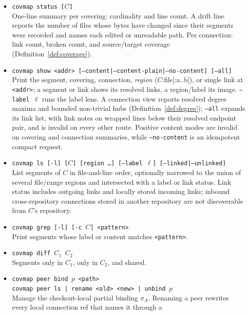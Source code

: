 \documentclass[11pt,a4paper]{article}
\begin{document}
\begin{itemize}[leftmargin=2em,itemsep=2pt]
\item \texttt{covmap status [$C$]}\\
      One-line summary per covering: cardinality and line count. A drift
      line reports the number of files whose bytes have changed since
      their segments were recorded and names each edited or unreadable
      path. Per connection: link count, broken count, and source/target
      coverage (Definition~\ref{def:coverage}).
\item \texttt{covmap show <addr>
      [--content|--content-plain|--no-content] [--all]}\\
      Print the segment, covering, connection, \emph{region}
      ($C$:file[:a..b]), or single link at \texttt{<addr>}; a segment or
      link shows its resolved links, a region/label its image. \texttt{--label
      $\ell$} runs the label lens. A connection view reports resolved degree
      maxima and bounded non-trivial hubs (Definition~\ref{def:degree});
      \texttt{--all} expands its link list, with link notes on wrapped lines
      below their resolved endpoint pair, and is invalid on every other
      route. Positive content modes are invalid on covering and connection
      summaries, while \texttt{--no-content} is an idempotent compact request.
\item \texttt{covmap ls [-l] [$C$] [region \ldots] [--label $\ell$] [--linked|--unlinked]}\\
      List segments of $C$ in file-and-line order, optionally narrowed to the
      union of several file/range regions and intersected with a label or link
      status. Link status includes outgoing links and locally stored incoming
      links; inbound cross-repository connections stored in another repository
      are not discoverable from $C$'s repository.
\item \texttt{covmap grep [-l] [-c $C$] <pattern>}\\
      Print segments whose label or content matches \texttt{<pattern>}.
\item \texttt{covmap diff $C_1$ $C_2$}\\
      Segments only in $C_1$, only in $C_2$, and shared.
\item \texttt{covmap peer bind $p$ <path>}\\
      \texttt{covmap peer ls | rename <old> <new> | unbind $p$}\\
      Manage the checkout-local partial binding $\pi_A$. Renaming a peer
      rewrites every local connection ref that names it through a

\end{itemize}
\end{document}
